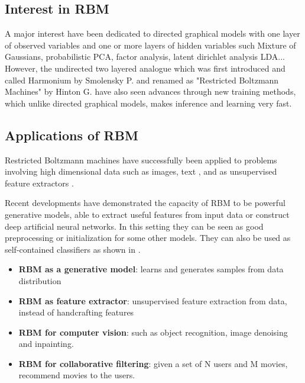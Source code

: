 \documentclass{article}
\begin{document}

\subsection{Interest in RBM}

A major interest have been dedicated to directed graphical models with one layer of observed variables and one or more layers of hidden variables such Mixture of Gaussians, probabilistic PCA, factor analysis, latent dirichlet analysis LDA... However, the undirected two layered analogue which was first introduced and called Harmonium by Smolensky P. \cite{smolensky1986information} and renamed as "Restricted Boltzmann Machines" by Hinton G. \cite{hinton2002training} have also seen advances through new training methods, which unlike directed graphical models, makes inference and learning very fast. 


\subsection{Applications of RBM}
Restricted Boltzmann machines have successfully been applied to problems involving high dimensional data such as images, text  \cite{hinton2006fast}, and as unsupervised feature extractors \cite{vincent2010stacked}.

Recent developments have demonstrated the capacity of RBM to be powerful generative models, able to extract useful features from input data or construct deep artificial neural networks. In this setting they can be seen as good preprocessing or initialization for some other models. They can also be used as self-contained classifiers as shown in \cite{larochelle2012learning}.

\begin{itemize}
		\item \textbf{RBM as a generative model}: learns and generates samples from data distribution 
		\item \textbf{RBM as feature extractor}: unsupervised feature extraction from data, instead of handcrafting features 
		\item \textbf{RBM for computer vision}: such as object recognition, image denoising and inpainting.
		\item \textbf{RBM for collaborative filtering}: given a set of N users and M movies, recommend movies to the users.
	\end{itemize}
\end{document}
